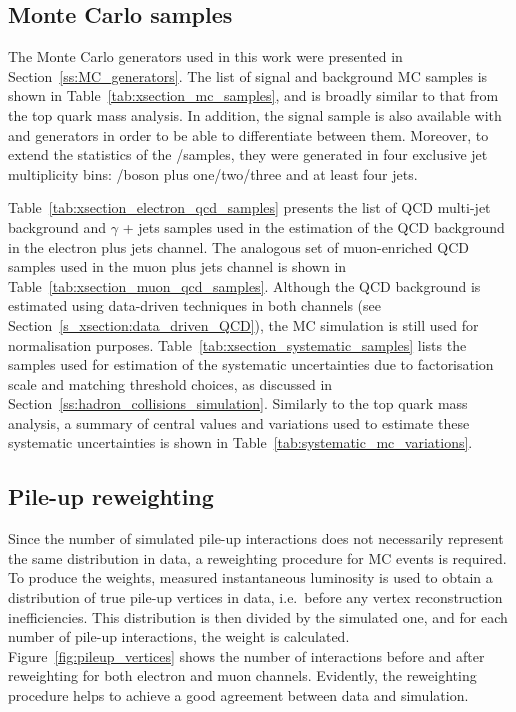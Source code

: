\subsection{Monte Carlo samples}
\label{ss_xsection:MC_samples}
The Monte Carlo generators used in this work were presented in Section~\ref{ss:MC_generators}. The list of signal and
background MC samples is shown in Table~\ref{tab:xsection_mc_samples}, and is broadly similar to that from the top quark
mass analysis. In addition, the signal \ttjets sample is also available with \POWHEG and \MCATNLO generators in order to
be able to differentiate between them. Moreover, to extend the statistics of the \W/\ZpJets samples, they were generated
in four exclusive jet multiplicity bins: \W/\Z boson plus one/two/three and at least four jets.

Table~\ref{tab:xsection_electron_qcd_samples} presents the list of QCD multi-jet background and $\gamma$ + jets samples
used in the estimation of the QCD background in the electron plus jets channel. The analogous set of muon-enriched QCD
samples used in the muon plus jets channel is shown in Table~\ref{tab:xsection_muon_qcd_samples}. Although the QCD
background is estimated using data-driven techniques in both channels (see Section~\ref{s_xsection:data_driven_QCD}),
the MC simulation is still used for normalisation purposes. Table~\ref{tab:xsection_systematic_samples} lists the
samples used for estimation of the systematic uncertainties due to factorisation scale and matching threshold choices,
as discussed in Section~\ref{ss:hadron_collisions_simulation}. Similarly to the top quark mass analysis, a summary of
central values and variations used to estimate these systematic uncertainties is shown in
Table~\ref{tab:systematic_mc_variations}.



\newpage
\subsection{Pile-up reweighting}
\label{sss_xsection:pileup_reweighting}
Since the number of simulated pile-up interactions does not necessarily represent the same distribution in data, a
reweighting procedure for MC events is required. To produce the weights, measured instantaneous luminosity is used to
obtain a distribution of true pile-up vertices in data, i.e.\ before any vertex reconstruction inefficiencies. This
distribution is then divided by the simulated one, and for each number of pile-up interactions, the weight is
calculated. Figure~\ref{fig:pileup_vertices} shows the number of interactions before and after reweighting for both
electron and muon channels. Evidently, the reweighting procedure helps to achieve a good agreement between data and
simulation.

